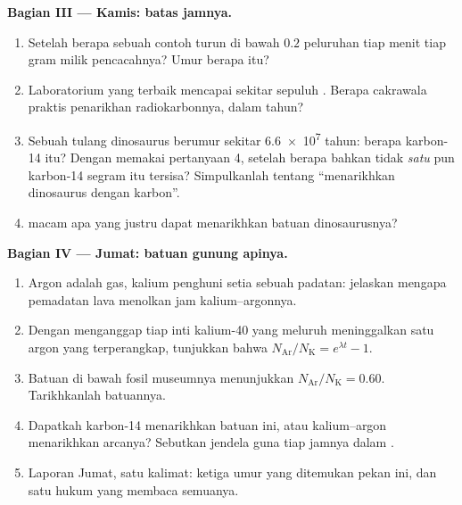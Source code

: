 \begin{problem}
\medskip
\noindent\textbf{Bagian III --- Kamis: batas jamnya.}
\begin{enumerate}[resume]
  \item Setelah berapa   sebuah contoh turun di bawah
        $0.2$ peluruhan tiap menit tiap gram milik pencacahnya? Umur berapa itu?
  \item Laboratorium yang terbaik mencapai sekitar sepuluh . Berapa
        cakrawala praktis penarikhan radiokarbonnya, dalam tahun?
  \item Sebuah tulang dinosaurus berumur sekitar \num{6.6e7} tahun: berapa
         karbon-14 itu? Dengan memakai pertanyaan 4, setelah berapa 
        bahkan tidak \emph{satu}  pun karbon-14 segram itu tersisa?
        Simpulkanlah tentang ``menarikhkan dinosaurus dengan karbon''.
  \item {} macam apa yang justru dapat menarikhkan batuan dinosaurusnya?
\end{enumerate}

\medskip
\noindent\textbf{Bagian IV --- Jumat: batuan gunung apinya.}
\begin{enumerate}[resume]
  \item Argon adalah gas, kalium penghuni setia sebuah padatan: jelaskan
        mengapa pemadatan lava menolkan jam kalium--argonnya.
  \item Dengan menganggap tiap inti kalium-40 yang meluruh meninggalkan satu 
        argon yang terperangkap, tunjukkan bahwa
        $N_{\mathrm{Ar}}/N_{\mathrm K} = e^{\lambda t} - 1$.
  \item Batuan di bawah fosil museumnya menunjukkan
        $N_{\mathrm{Ar}}/N_{\mathrm K} = 0.60$. Tarikhkanlah batuannya.
  \item Dapatkah karbon-14 menarikhkan batuan ini, atau kalium--argon menarikhkan
        arcanya? Sebutkan jendela guna tiap jamnya dalam .
  \item Laporan Jumat, satu kalimat: ketiga umur yang ditemukan pekan ini, dan
        satu hukum yang membaca semuanya.
\end{enumerate}
\end{problem}

